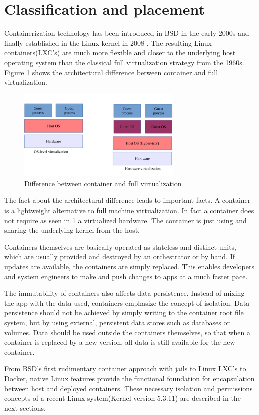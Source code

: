 \section{Classification and placement}
\label{sec:intro:containerization}
Containerization technology has been introduced in BSD in the early 2000s and finally established in the Linux kernel in 2008 \cite{Souppaya:2017aa}. The resulting Linux containers(LXC's) are much more flexible and closer to the underlying host operating system than the classical full virtualization strategy from the 1960s. Figure \ref{fig:intro:diff_container_vm} shows the architectural difference between container and full virtualization. 

\begin{figure}[htbp]
 \centering
 \includegraphics[width=0.7\textwidth]{gfx/examples/os_virt_diff}
 \caption{Difference between container and full virtualization}
 \label{fig:intro:diff_container_vm}
\end{figure}
The fact about the architectural difference leads to important facts.
A container is a lightweight alternative to full machine virtualization. In fact a container does not require as seen in \ref{fig:intro:diff_container_vm} a virtualized hardware. The container is just using and sharing the underlying kernel from the host. 

Containers themselves are basically operated as stateless and distinct units, which are usually provided and destroyed by an orchestrator or by hand. If updates are available, the containers are simply replaced. This enables developers and system engineers to make and push changes to apps at a much faster pace.

The immutability of containers also affects data persistence. Instead of mixing the app with the data used, containers emphasize the concept of isolation. Data persistence should not be achieved by simply writing to the container root file system, but by using external, persistent data stores such as databases or volumes. Data should be used outside the containers themselves, so that when a container is replaced by a new version, all data is still available for the new container.

From BSD's first rudimentary container approach with jails to Linux LXC's to Docker, native Linux features provide the functional foundation for encapsulation between host and deployed containers.
These necessary isolation and permissions concepts of a recent Linux system(Kernel version 5.3.11) are described in the next sections.